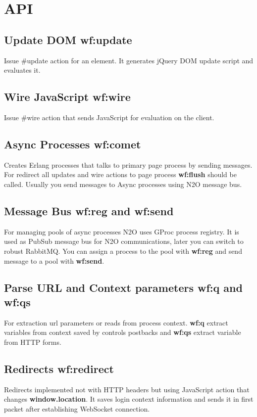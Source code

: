 \section{API}

\subsection{Update DOM \bf{wf:update}}
Issue \#update{} action for an element.
It generates jQuery DOM update script and evaluates it.

\subsection{Wire JavaScript \bf{wf:wire}}
Issue \#wire{} action that sends JavaScript for evaluation on the client.

\subsection{Async Processes \bf{wf:comet}}
Creates Erlang processes that talks to primary page process by sending messages.
For redirect all updates and wire actions to page process {\bf wf:flush} should be called.
Usually you send messages to Async processes using N2O message bus.

\subsection{Message Bus {\bf wf:reg} and {\bf wf:send}}
For managing pools of async processes N2O uses GProc process registry.
It is used as PubSub message bus for N2O communications, later you can switch to robust RabbitMQ.
You can assign a process to the pool with {\bf wf:reg} and send message to a pool with {\bf wf:send}.

\subsection{Parse URL and Context parameters {\bf wf:q} and {\bf wf:qs}}
For extraction url parameters or reads from process context. {\bf wf:q} extract variables
from context saved by controls postbacks and {\bf wf:qs} extract variable from HTTP forms.

\subsection{Redirects {\bf wf:redirect}}
Redirects implemented not with HTTP headers but using JavaScript action that changes {\bf window.location}.
It saves login context information and sends it in first packet after establishing WebSocket connection.

